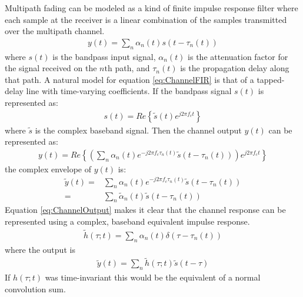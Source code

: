 Multipath fading can be modeled as a kind of %
finite impulse response filter where each %
sample at the receiver is a linear combination %
of the samples transmitted over the multipath %
channel.
\begin{align}
	y(t) = \sum_{n} \alpha_{n}(t)s(t-\tau_{n}(t))
	\label{eq:ChannelFIR}
\end{align}
where $s(t)$ is the bandpass input signal, $\alpha_n(t)$ %
is the attenuation factor for the signal received %
on the $n\text{th}$ path, and $\tau_n(t)$ is the %
propagation delay along that path. A natural model %
for equation \ref{eq:ChannelFIR} is that of a %
tapped-delay line with time-varying coefficients. %
If the bandpass signal $s(t)$ is represented as:
\begin{align}
	s(t) = Re\left\{ \tilde{s}%
	(t)e^{j2\pi f_{c} t} \right\}
\end{align}
where $\tilde{s}$ is the complex baseband signal. %
Then the channel output $y(t)$ can be represented as:
\begin{align}
	y(t) = Re\left\{\left( \sum_{n} %
	\alpha_{n}(t) e^{-j2 \pi f_{c} \tau_{n}(t)} %
	\tilde{s}(t - \tau_{n}(t)) \right)%
	e^{j 2\pi f_{c} t} \right\}
\end{align}
the complex envelope of $y(t)$ is:
\begin{align}
	\tilde{y}(t) =& \sum_{n}\alpha_{n}(t)%
	e^{-j 2\pi f_{c} \tau_{n}(t)} %
	\tilde{s}(t - \tau_{n}(t))\\
		     =& \sum_{n}%
	\tilde{\alpha}_{n}(t)\tilde{s}(%
	t-\tau_{n}(t))
	\label{eq:ChannelOutput}
\end{align}
Equation \ref{eq:ChannelOutput} makes it clear that %
the channel response can be represented using a %
complex, baseband equivalent impulse response.
\begin{align}
	\tilde{h}(\tau;t) = \sum_{n} %
	\alpha_{n}(t)\delta(\tau - %
	\tau_{n}(t))
\end{align}
where the output is
\begin{align}
	\tilde{y}(t) = \sum_{n} \tilde{h}%
	(\tau;t)\tilde{s}(t - \tau)
	\label{eq:BasebandChannelFIR}
\end{align}
If $h(\tau;t)$ was time-invariant this would be the %
equivalent of a normal convolution sum.

